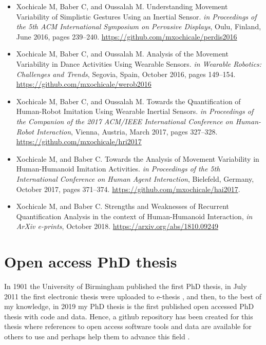 \begin{itemize}
\item Xochicale M, Baber C, and Oussalah M. 
	Understanding Movement Variability of Simplistic Gestures Using 
	an Inertial Sensor. 
	\textit{in Proceedings of the 5th ACM International 
	Symposium on Pervasive Displays}, 
	Oulu, Finland, June 2016, 
	pages 239--240.
	\url{https://github.com/mxochicale/perdis2016}

\item Xochicale M, Baber C, and Oussalah M.
	Analysis of the Movement Variability in Dance Activities Using 
	Wearable Sensors.
	\textit{in Wearable Robotics: Challenges and Trends},
	Segovia, Spain, October 2016,
	pages 149--154. \\
	\url{https://github.com/mxochicale/werob2016}

\item Xochicale M, Baber C, and Oussalah M.
	Towards the Quantification of Human-Robot Imitation Using Wearable 
	Inertial Sensors.
	\textit{in Proceedings of the Companion of the 2017 
	ACM/IEEE International Conference on Human-Robot Interaction},
	Vienna, Austria, March 2017,
	pages 327--328. \\
	\url{https://github.com/mxochicale/hri2017}

\item Xochicale M, and Baber C.
	Towards the Analysis of Movement Variability in Human-Humanoid 
	Imitation Activities.
	\textit{in Proceedings of the 5th International 
	Conference on Human Agent Interaction},
	Bielefeld, Germany, October 2017,
	pages 371--374.
	\url{https://github.com/mxochicale/hai2017}.

\item Xochicale M, and Baber C.
	Strengths and Weaknesses of Recurrent Quantification Analysis in 
	the context of Human-Humanoid Interaction,
	\textit{in ArXiv e-prints}, 
	October 2018.
	\url{https://arxiv.org/abs/1810.09249}
\end{itemize}

\section{Open access PhD thesis}
In 1901 the University of Birmingham published the first PhD thesis, 
in July 2011 the first electronic thesis were uploaded to e-thesis 
\citep{ethesis-bham}, 
and then, to the best of my knowledge, in 2019 my PhD thesis is the 
first published open accessed PhD thesis with code and data.
Hence, a github repository has been created for this thesis 
where references to open access software tools and data are 
available for others to use and perhaps help 
them to advance this field \citep{xochicale2018}.


